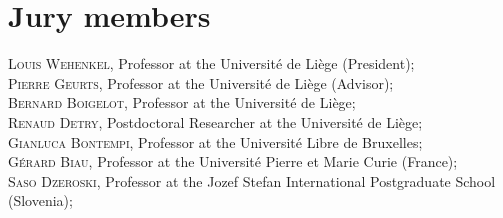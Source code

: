 
\chapter*{Jury members}


\noindent \textsc{Louis Wehenkel}, Professor at the Universit{\'e} de Li{\`e}ge (President); \\

\noindent \textsc{Pierre Geurts}, Professor at the Universit{\'e} de Li{\`e}ge (Advisor); \\

\noindent \textsc{Bernard Boigelot}, Professor at the Universit{\'e} de Li{\`e}ge; \\

\noindent \textsc{Renaud Detry}, Postdoctoral Researcher at the Universit{\'e} de Li{\`e}ge; \\

\noindent \textsc{Gianluca Bontempi}, Professor at the Universit{\'e} Libre de Bruxelles; \\

\noindent \textsc{G{\'e}rard Biau}, Professor at the Universit{\'e} Pierre et Marie Curie (France); \\

\noindent \textsc{Saso Dzeroski}, Professor at the Jozef Stefan International Postgraduate School (Slovenia); \\
